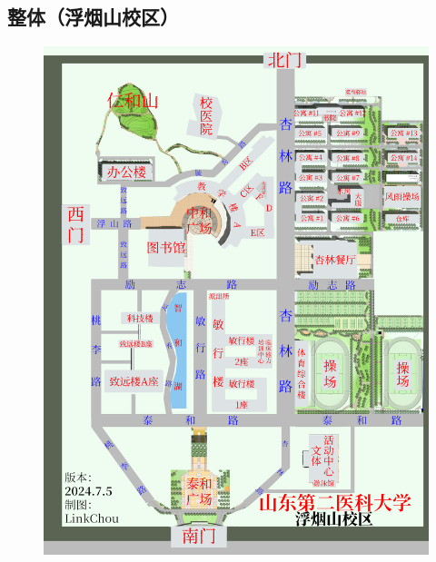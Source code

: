 \subsection[整体（浮烟山校区）]{整体（浮烟山校区）}
\begin{figure}[H]
    \centering
    \includegraphics*[height=0.9\textheight]{resources/map/浮烟山校区整体地图.pdf}
    \label{map_fuyanshan_holistic}
\end{figure}

\newpage
